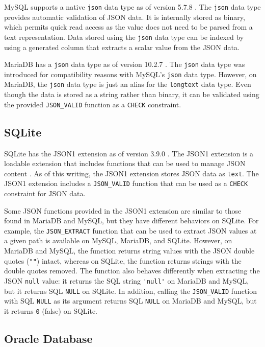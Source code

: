 MySQL supports a native \verb|json| data type as of version 5.7.8
\cite{mysql:json}. The \verb|json| data type provides automatic validation of
JSON data. It is internally stored as binary, which permits quick read access
as the value does not need to be parsed from a text representation. Data stored
using the \verb|json| data type can be indexed by using a generated column that
extracts a scalar value from the JSON data.

MariaDB has a \verb|json| data type as of version 10.2.7 \cite{mariadb:json}.
The \verb|json| data type was introduced for compatibility reasons with MySQL's
\verb|json| data type. However, on MariaDB, the \verb|json| data type is just
an alias for the \verb|longtext| data type. Even though the data is stored as a
string rather than binary, it can be validated using the provided
\verb|JSON_VALID| function as a \verb|CHECK| constraint.

\subsection{SQLite}

SQLite has the JSON1 extension as of version 3.9.0 \cite{sqlite:3.9.0}. The
JSON1 extension is a loadable extension that includes functions that can be
used to manage JSON content \cite{sqlite:json1}. As of this writing, the JSON1
extension stores JSON data as \verb|text|. The JSON1 extension includes a
\verb|JSON_VALID| function that can be used as a \verb|CHECK| constraint for
JSON data.

Some JSON functions provided in the JSON1 extension are similar to those found
in MariaDB and MySQL, but they have different behaviors on SQLite. For example,
the \verb|JSON_EXTRACT| function that can be used to extract JSON values at a
given path is available on MySQL, MariaDB, and SQLite. However, on MariaDB and
MySQL, the function returns string values with the JSON double quotes
(\verb|""|) intact, whereas on SQLite, the function returns strings with the
double quotes removed. The function also behaves differently when extracting
the JSON \verb|null| value: it returns the SQL string \verb|'null'| on MariaDB
and MySQL, but it returns SQL \verb|NULL| on SQLite. In addition, calling the
\verb|JSON_VALID| function with SQL \verb|NULL| as its argument returns SQL
\verb|NULL| on MariaDB and MySQL, but it returns \verb|0| (false) on SQLite.

\subsection{Oracle Database}

